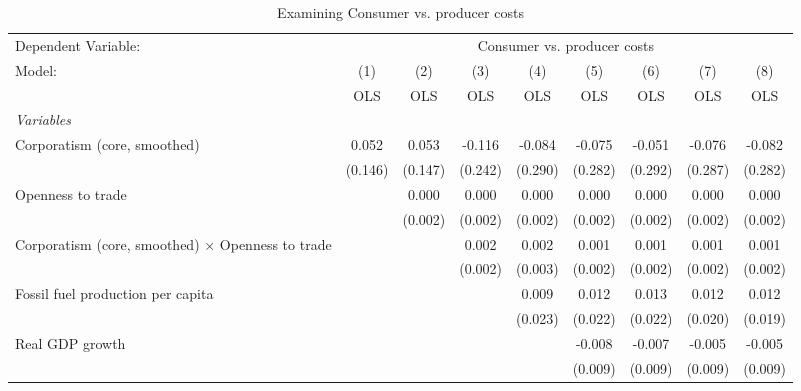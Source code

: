 
\begin{table}[htbp]
   \caption{Examining Consumer vs. producer costs}
   \centering
   \begin{tabular}{lcccccccc}
      \toprule
      Dependent Variable: & \multicolumn{8}{c}{Consumer vs. producer costs}\\
      Model:                                                   & (1)     & (2)     & (3)     & (4)     & (5)     & (6)     & (7)     & (8)\\  
                                                               &  OLS    & OLS     & OLS     & OLS     & OLS     & OLS     & OLS     & OLS\\  
      \midrule
      \emph{Variables}\\
      Corporatism (core, smoothed)                             & 0.052   & 0.053   & -0.116  & -0.084  & -0.075  & -0.051  & -0.076  & -0.082\\   
                                                               & (0.146) & (0.147) & (0.242) & (0.290) & (0.282) & (0.292) & (0.287) & (0.282)\\   
      Openness to trade                                        &         & 0.000   & 0.000   & 0.000   & 0.000   & 0.000   & 0.000   & 0.000\\   
                                                               &         & (0.002) & (0.002) & (0.002) & (0.002) & (0.002) & (0.002) & (0.002)\\   
      Corporatism (core, smoothed) $\times$ Openness to trade  &         &         & 0.002   & 0.002   & 0.001   & 0.001   & 0.001   & 0.001\\   
                                                               &         &         & (0.002) & (0.003) & (0.002) & (0.002) & (0.002) & (0.002)\\   
      Fossil fuel production per capita                        &         &         &         & 0.009   & 0.012   & 0.013   & 0.012   & 0.012\\   
                                                               &         &         &         & (0.023) & (0.022) & (0.022) & (0.020) & (0.019)\\   
      Real GDP growth                                          &         &         &         &         & -0.008  & -0.007  & -0.005  & -0.005\\   
                                                               &         &         &         &         & (0.009) & (0.009) & (0.009) & (0.009)\\   

\end{tabular}
\end{table}
